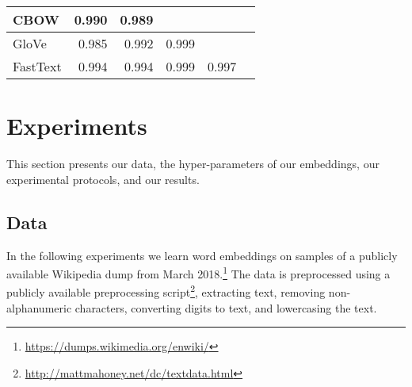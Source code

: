 \documentclass[11pt,a4paper]{article}
\begin{document}
\begin{table*}
\begin{center}
\begin{small}
\begin{tabular}{l|r|r|r|r|r}
\midrule
\multirow{1}{*}{CBOW}&0.990&0.989&\cellcolor{gray!25}&\cellcolor{gray!25}&\cellcolor{gray!25}\\%
\midrule
\multirow{1}{*}{GloVe}&0.985&0.992&0.999&\cellcolor{gray!25}&\cellcolor{gray!25}\\%
\midrule
\multirow{1}{*}{FastText}&0.994&0.994&0.999&0.997&\cellcolor{gray!25}\\%
\bottomrule
\end{tabular}\end{small}
\caption{Precision at 1 (P@1) for unsupervised GAN alignment with Procrustes refinement (top) and supervised Procrustes analysis for the cases in which unsupervised alignment fails (bottom). Results clearly show that GANs can align two independent embeddings induced by the same algorithm; but not embeddings aligned by different ones. Supervised Procrustes analysis, on the other hand, perfectly aligns the embeddings in both cases. }\label{t:algvsalg}
\end{center}
\end{table*}

\section{Experiments}

This section presents our data, the hyper-parameters of our embeddings, our experimental protocols, and our results. 

\subsection{Data}
In the following experiments we learn word embeddings on samples of a publicly available Wikipedia dump from March 2018.\footnote{\url{https://dumps.wikimedia.org/enwiki/}} 
The data is preprocessed using a publicly available preprocessing script\footnote{\url{http://mattmahoney.net/dc/textdata.html}}, extracting text,  removing non-alphanumeric characters, converting digits to text, and lowercasing the text.
\end{document}

